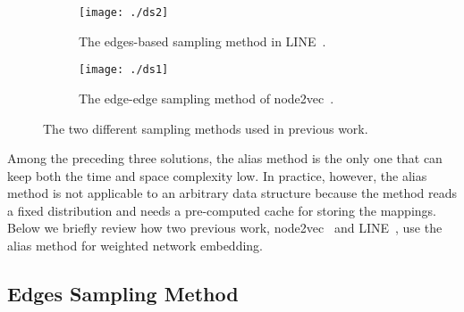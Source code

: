 


\begin{figure*}
  \begin{subfigure}{.45\textwidth}
    \centering
    \vspace{0.5cm}
    \texttt{[image: ./ds2]}
    \vspace{0.5cm}
    \caption{The edges-based sampling method in LINE~\cite{line}.}
    \label{fig:edges}
  \end{subfigure}%
  \begin{subfigure}{.55\textwidth}
    \centering
    \texttt{[image: ./ds1]}
    \caption{The edge-edge sampling method of node2vec~\cite{n2v}.}
    \label{fig:e2e}
  \end{subfigure}
  \caption{The two different sampling methods used in previous work.}
  \label{fig:method}
\end{figure*}

Among the preceding three solutions, the alias method is the only one that can keep both the time and space complexity low. In practice, however, the alias method is not applicable to an arbitrary data structure because the method reads a fixed distribution and needs a pre-computed cache for storing the mappings. Below we briefly review how two previous work, node2vec~\cite{n2v} and LINE~\cite{line}, use the alias method for weighted network embedding. %

\subsection{Edges Sampling Method}\label{sec:edge}

